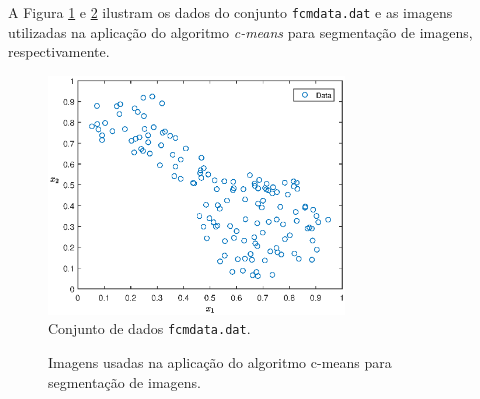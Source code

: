 \documentclass[12pt,a4paper]{article}
\numberwithin{equation}{section}
\begin{document}
{A Figura \ref{fig:fcmdata} e \ref{fig:images} ilustram os dados do conjunto \texttt{fcmdata.dat} e as imagens utilizadas na aplicação do algoritmo \textit{c-means} para segmentação de imagens, respectivamente.

\begin{figure}[ht!]
	\centering
	\includegraphics[width=0.7\textwidth]{figures/data.eps}
	\caption{Conjunto de dados \texttt{fcmdata.dat}.}
	\label{fig:fcmdata}
\end{figure}

\begin{figure}[!htbp]
	\centering
	\caption{Imagens usadas na aplicação do algoritmo c-means para segmentação de imagens.}
	\label{fig:images}
\end{figure}

}
\end{document}
